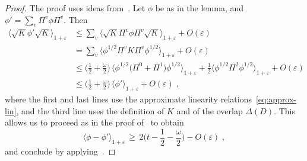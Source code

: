 \documentclass[11pt]{article}
\theoremstyle{remark}
\theoremstyle{definition}
\newcommand{\eps}{\varepsilon}
\begin{document}
\begin{proof}
The proof uses ideas from~\cite{miller2016robust}. Let $\phi$ be as in the lemma, and $\phi' = \sum_v \Pi^v \phi \Pi^v$. Then 
\begin{align*}
\langle \sqrt{K} \phi' \sqrt{K} \rangle_{1+\eps} &\leq \sum_v \langle \sqrt{K} \Pi^v \phi\Pi^v \sqrt{K} \rangle_{1+\eps} + O(\eps)\\
&= \sum_v \langle  \phi^{1/2} \Pi^v K \Pi^v\phi^{1/2} \rangle_{1+\eps} + O(\eps)\\
&\leq \Big(\frac{1}{2}+\frac{\omega}{2}\Big)\,\langle  \phi^{1/2} \big(\Pi^0+\Pi^1\big) \phi^{1/2}\rangle_{1+\eps} + \frac{1}{2} \langle \phi^{1/2} \Pi^2 \phi^{1/2}\rangle_{1+\eps} + O(\eps)\\
&\leq \Big(\frac{1}{2}+\frac{\omega}{2}\Big)\, \langle \phi' \rangle_{1+\eps} + O(\eps)\;,
\end{align*}
where the first and last lines use the approximate linearity relations~\eqref{eq:approx-lin}, and the third line uses the definition of $K$ and of the overlap $\Delta(D)$. This allows us to proceed as in the proof of~\cite[Theorem 6.3]{miller2016robust} to obtain 
$$ \langle \phi-\phi'\rangle_{1+\eps} \,\geq\, 2\Big( t- \frac{1}{2}-\frac{\omega}{2}\Big) - O(\eps)\;,$$
and conclude by applying~\cite[Proposition 5.3]{miller2016robust}.
\end{proof}
\end{document}
